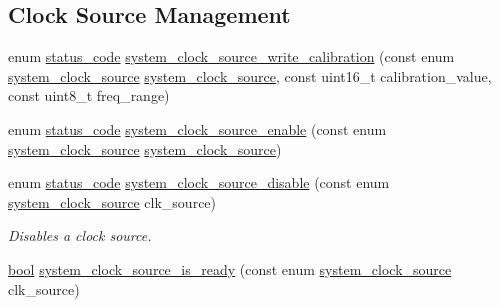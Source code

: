 \subsection*{Clock Source Management}
\begin{DoxyCompactItemize}
\item 
enum \mbox{\hyperlink{group__group__sam0__utils__status__codes_ga751c892e5a46b8e7d282085a5a5bf151}{status\+\_\+code}} \mbox{\hyperlink{group__asfdoc__sam0__system__clock__group_ga9b801cecbdb70ee5eec6e556dc659997}{system\+\_\+clock\+\_\+source\+\_\+write\+\_\+calibration}} (const enum \mbox{\hyperlink{group__asfdoc__sam0__system__clock__group_ga86882dc960f2552722e9713da97fcc58}{system\+\_\+clock\+\_\+source}} \mbox{\hyperlink{group__asfdoc__sam0__system__clock__group_ga86882dc960f2552722e9713da97fcc58}{system\+\_\+clock\+\_\+source}}, const uint16\+\_\+t calibration\+\_\+value, const uint8\+\_\+t freq\+\_\+range)
\item 
enum \mbox{\hyperlink{group__group__sam0__utils__status__codes_ga751c892e5a46b8e7d282085a5a5bf151}{status\+\_\+code}} \mbox{\hyperlink{group__asfdoc__sam0__system__clock__group_gad1e70dd9d08ec72e6a1cbef848ff8189}{system\+\_\+clock\+\_\+source\+\_\+enable}} (const enum \mbox{\hyperlink{group__asfdoc__sam0__system__clock__group_ga86882dc960f2552722e9713da97fcc58}{system\+\_\+clock\+\_\+source}} \mbox{\hyperlink{group__asfdoc__sam0__system__clock__group_ga86882dc960f2552722e9713da97fcc58}{system\+\_\+clock\+\_\+source}})
\item 
enum \mbox{\hyperlink{group__group__sam0__utils__status__codes_ga751c892e5a46b8e7d282085a5a5bf151}{status\+\_\+code}} \mbox{\hyperlink{group__asfdoc__sam0__system__clock__group_gacea9ce7a68fc3b0b2a46f3a8c3d6d89b}{system\+\_\+clock\+\_\+source\+\_\+disable}} (const enum \mbox{\hyperlink{group__asfdoc__sam0__system__clock__group_ga86882dc960f2552722e9713da97fcc58}{system\+\_\+clock\+\_\+source}} clk\+\_\+source)
\begin{DoxyCompactList}\small\item\em Disables a clock source. \end{DoxyCompactList}\item 
\mbox{\hyperlink{group__group__sam0__utils_ga97a80ca1602ebf2303258971a2c938e2}{bool}} \mbox{\hyperlink{group__asfdoc__sam0__system__clock__group_ga2f18617c9770bf1c3ab8fdac5081e65e}{system\+\_\+clock\+\_\+source\+\_\+is\+\_\+ready}} (const enum \mbox{\hyperlink{group__asfdoc__sam0__system__clock__group_ga86882dc960f2552722e9713da97fcc58}{system\+\_\+clock\+\_\+source}} clk\+\_\+source)

\end{DoxyCompactItemize}
